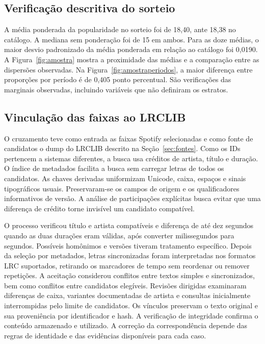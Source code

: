 \subsection{Verificação descritiva do sorteio}
A média ponderada da popularidade no sorteio foi de 18,40, ante 18,38 no catálogo. A mediana sem ponderação foi de 15 em ambos. Para as doze médias, o maior desvio padronizado da média ponderada em relação ao catálogo foi 0,0190. A Figura~\ref{fig:amostra} mostra a proximidade das médias e a comparação entre as dispersões observadas. Na Figura~\ref{fig:amostraperiodos}, a maior diferença entre proporções por período é de 0,405 ponto percentual. São verificações das marginais observadas, incluindo variáveis que não definiram os estratos.


\subsection{Vinculação das faixas ao LRCLIB}
O cruzamento teve como entrada as faixas Spotify selecionadas e como fonte de candidatos o dump do LRCLIB descrito na Seção~\ref{sec:fontes}. Como os IDs pertencem a sistemas diferentes, a busca usa créditos de artista, título e duração. O índice de metadados facilita a busca sem carregar letras de todos os candidatos. As chaves derivadas uniformizam Unicode, caixa, espaços e sinais tipográficos usuais. Preservaram-se os campos de origem e os qualificadores informativos de versão. A análise de participações explícitas busca evitar que uma diferença de crédito torne invisível um candidato compatível.

O processo verificou título e artista compatíveis e diferença de até dez segundos quando as duas durações eram válidas, após converter milissegundos para segundos. Possíveis homônimos e versões tiveram tratamento específico. Depois da seleção por metadados, letras sincronizadas foram interpretadas nos formatos LRC suportados, retirando os marcadores de tempo sem reordenar ou remover repetições. A aceitação considerou conflitos entre textos simples e sincronizados, bem como conflitos entre candidatos elegíveis. Revisões dirigidas examinaram diferenças de caixa, variantes documentadas de artista e consultas inicialmente interrompidas pelo limite de candidatos. Os vínculos preservam o texto original e sua proveniência por identificador e hash. A verificação de integridade confirma o conteúdo armazenado e utilizado. A correção da correspondência depende das regras de identidade e das evidências disponíveis para cada caso.

